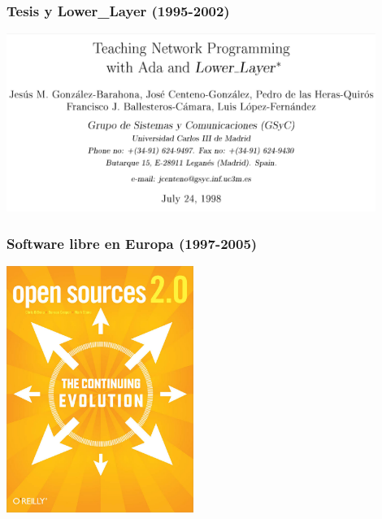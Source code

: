 \begin{frame}[fragile]
  \frametitle{Tesis y Lower\_Layer (1995-2002)}

  \begin{center}
  \includegraphics[width=12cm]{figs/lower-layer}
  \end{center}  
  
\end{frame}

\begin{frame}[fragile]
  \frametitle{Software libre en Europa (1997-2005)}

  \begin{center}
  \includegraphics[height=8cm]{figs/opensources}
  \end{center}  
  
\end{frame}

